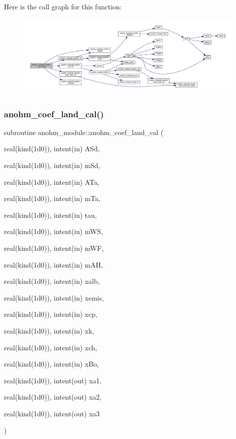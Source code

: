 Here is the call graph for this function\+:\nopagebreak
\begin{figure}[H]
\begin{center}
\leavevmode
\includegraphics[width=350pt]{namespaceanohm__module_abe3a233f6e7d95775554ccc25e1cac45_cgraph}
\end{center}
\end{figure}
\mbox{\label{namespaceanohm__module_a20235f7bc1aada21135014d0e942e59f}} 
\subsubsection{\texorpdfstring{anohm\+\_\+coef\+\_\+land\+\_\+cal()}{anohm\_coef\_land\_cal()}}
{\footnotesize\ttfamily subroutine anohm\+\_\+module\+::anohm\+\_\+coef\+\_\+land\+\_\+cal (\begin{DoxyParamCaption}\item[{real(kind(1d0)), intent(in)}]{A\+Sd,  }\item[{real(kind(1d0)), intent(in)}]{m\+Sd,  }\item[{real(kind(1d0)), intent(in)}]{A\+Ta,  }\item[{real(kind(1d0)), intent(in)}]{m\+Ta,  }\item[{real(kind(1d0)), intent(in)}]{tau,  }\item[{real(kind(1d0)), intent(in)}]{m\+WS,  }\item[{real(kind(1d0)), intent(in)}]{m\+WF,  }\item[{real(kind(1d0)), intent(in)}]{m\+AH,  }\item[{real(kind(1d0)), intent(in)}]{xalb,  }\item[{real(kind(1d0)), intent(in)}]{xemis,  }\item[{real(kind(1d0)), intent(in)}]{xcp,  }\item[{real(kind(1d0)), intent(in)}]{xk,  }\item[{real(kind(1d0)), intent(in)}]{xch,  }\item[{real(kind(1d0)), intent(in)}]{x\+Bo,  }\item[{real(kind(1d0)), intent(out)}]{xa1,  }\item[{real(kind(1d0)), intent(out)}]{xa2,  }\item[{real(kind(1d0)), intent(out)}]{xa3 }\end{DoxyParamCaption})}



